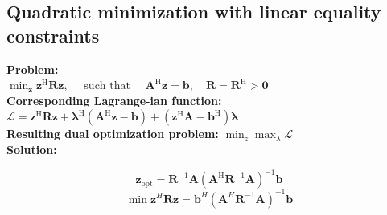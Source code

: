 \documentclass[english]{latex4ei/latex4ei_sheet}
\begin{document}
\begin{sectionbox}
  \subsection{Quadratic minimization with linear equality constraints}
  \textbf{Problem:}\\
  $\min _{\boldsymbol{z}} \boldsymbol{z}^{\mathrm{H}} \boldsymbol{R} \boldsymbol{z}, \quad \text { such that } \quad \boldsymbol{A}^{\mathrm{H}} \boldsymbol{z}=\boldsymbol{b}, \quad \boldsymbol{R}=\boldsymbol{R}^{\mathrm{H}}>\boldsymbol{0}$\\
  
  \textbf{Corresponding Lagrange-ian function:}\\
  $\mathcal{L}=\boldsymbol{z}^{\mathrm{H}} \boldsymbol{R} \boldsymbol{z}+\boldsymbol{\lambda}^{\mathrm{H}}\left(\boldsymbol{A}^{\mathrm{H}} \boldsymbol{z}-\boldsymbol{b}\right)+\left(\boldsymbol{z}^{\mathrm{H}} \boldsymbol{A}-\boldsymbol{b}^{\mathrm{H}}\right) \boldsymbol{\lambda}$\\

  \textbf{Resulting dual optimization problem:} $\min _{z} \max _{\lambda} \mathcal{L}$\\

  \textbf{Solution:}
  \begin{emphbox}
    \vspace{-0.2cm}
    $$\boldsymbol{z}_{\mathrm{opt}}=\boldsymbol{R}^{-1} \boldsymbol{A}\left(\boldsymbol{A}^{\mathrm{H}} \boldsymbol{R}^{-1} \boldsymbol{A}\right)^{-1} \boldsymbol{b}$$
    $$\operatorname{min} \boldsymbol{z}^H\boldsymbol{R}\boldsymbol{z} = \boldsymbol{b}^H(\boldsymbol{A}^H\boldsymbol{R}^{-1}\boldsymbol{A})^{-1}\boldsymbol{b}$$
  \end{emphbox}

\end{sectionbox}
\end{document}
